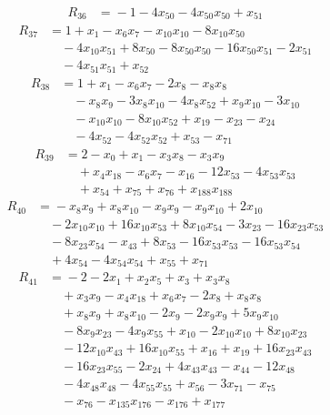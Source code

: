 \begin{align*}
R_{36}&={}-1 -4x_{50} -4x_{50}x_{50} +x_{51}
\end{align*}
\begin{align*}
R_{37}&={}1 +x_{1} -x_{6}x_{7} -x_{10}x_{10} -8x_{10}x_{50}\\
&\quad{}-4x_{10}x_{51} +8x_{50} -8x_{50}x_{50} -16x_{50}x_{51} -2x_{51}\\
&\quad{}-4x_{51}x_{51} +x_{52}
\end{align*}
\begin{align*}
R_{38}&={}1 +x_{1} -x_{6}x_{7} -2x_{8} -x_{8}x_{8}\\
&\quad{}-x_{8}x_{9} -3x_{8}x_{10} -4x_{8}x_{52} +x_{9}x_{10} -3x_{10}\\
&\quad{}-x_{10}x_{10} -8x_{10}x_{52} +x_{19} -x_{23} -x_{24}\\
&\quad{}-4x_{52} -4x_{52}x_{52} +x_{53} -x_{71}
\end{align*}
\begin{align*}
R_{39}&={}2 -x_{0} +x_{1} -x_{3}x_{8} -x_{3}x_{9}\\
&\quad{}+x_{4}x_{18} -x_{6}x_{7} -x_{16} -12x_{53} -4x_{53}x_{53}\\
&\quad{}+x_{54} +x_{75} +x_{76} +x_{188}x_{188}
\end{align*}
\begin{align*}
R_{40}&={}-x_{8}x_{9} +x_{8}x_{10} -x_{9}x_{9} -x_{9}x_{10} +2x_{10}\\
&\quad{}-2x_{10}x_{10} +16x_{10}x_{53} +8x_{10}x_{54} -3x_{23} -16x_{23}x_{53}\\
&\quad{}-8x_{23}x_{54} -x_{43} +8x_{53} -16x_{53}x_{53} -16x_{53}x_{54}\\
&\quad{}+4x_{54} -4x_{54}x_{54} +x_{55} +x_{71}
\end{align*}
\begin{align*}
R_{41}&={}-2 -2x_{1} +x_{2}x_{5} +x_{3} +x_{3}x_{8}\\
&\quad{}+x_{3}x_{9} -x_{4}x_{18} +x_{6}x_{7} -2x_{8} +x_{8}x_{8}\\
&\quad{}+x_{8}x_{9} +x_{8}x_{10} -2x_{9} -2x_{9}x_{9} +5x_{9}x_{10}\\
&\quad{}-8x_{9}x_{23} -4x_{9}x_{55} +x_{10} -2x_{10}x_{10} +8x_{10}x_{23}\\
&\quad{}-12x_{10}x_{43} +16x_{10}x_{55} +x_{16} +x_{19} +16x_{23}x_{43}\\
&\quad{}-16x_{23}x_{55} -2x_{24} +4x_{43}x_{43} -x_{44} -12x_{48}\\
&\quad{}-4x_{48}x_{48} -4x_{55}x_{55} +x_{56} -3x_{71} -x_{75}\\
&\quad{}-x_{76} -x_{135}x_{176} -x_{176} +x_{177}
\end{align*}
